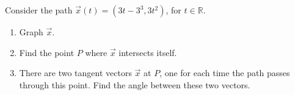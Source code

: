 \begin{problem}
Consider the path $\vec{x}(t) = (3t-3^3, 3t^2)$, for $t\in\mathbb{R}$.
\begin{enumerate}
\item Graph $\vec{x}$.
\item Find the point $P$ where $\vec{x}$ intersects itself.
\item There are two tangent vectors $\vec{x}$ at $P$, one for each time the path passes through this point. Find the angle between these two vectors.
\end{enumerate}
\end{problem}